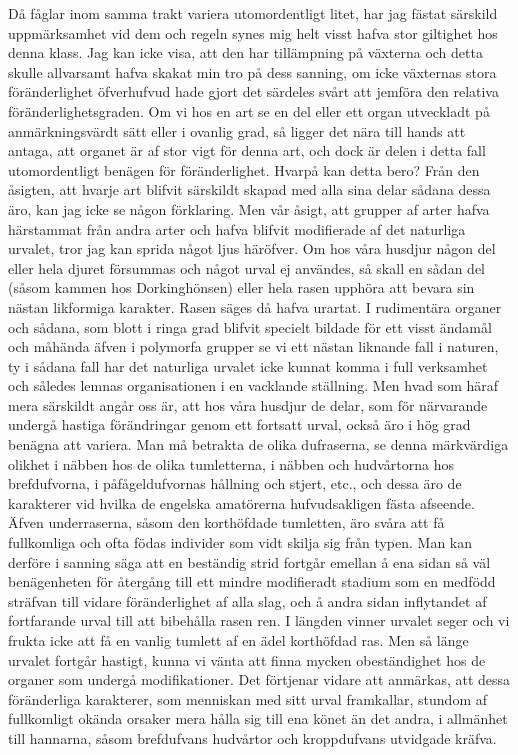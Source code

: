 Då fåglar inom samma trakt variera utomordentligt litet, har jag fästat särskild uppmärksamhet vid dem och regeln synes mig helt visst hafva stor giltighet hos denna klass. Jag kan icke visa, att den har tillämpning på växterna och detta skulle allvarsamt hafva skakat min tro på dess sanning, om icke växternas stora föränderlighet öfverhufvud hade gjort det särdeles svårt att jemföra den relativa föränderlighetsgraden.
Om vi hos en art se en del eller ett organ utveckladt på anmärkningsvärdt sätt eller i ovanlig grad, så ligger det nära till hands att antaga, att organet är af stor vigt för denna art, och dock är delen i detta fall utomordentligt benägen för föränderlighet. Hvarpå kan detta bero? Från den åsigten, att hvarje art blifvit särskildt skapad med alla sina delar sådana dessa äro, kan jag icke se någon förklaring. Men vår åsigt, att grupper af arter hafva härstammat från andra arter och hafva blifvit modifierade af det naturliga urvalet, tror jag kan sprida något ljus häröfver. Om hos våra husdjur någon del eller hela djuret försummas och något urval ej användes, så skall en sådan del (såsom kammen hos Dorkinghönsen) eller hela rasen upphöra att bevara sin nästan likformiga karakter. Rasen säges då hafva urartat. I rudimentära organer och sådana, som blott i ringa grad blifvit specielt bildade för ett visst ändamål och måhända äfven i polymorfa grupper se vi ett nästan liknande fall i naturen, ty i sådana fall har det naturliga urvalet icke kunnat komma i full verksamhet och således lemnas organisationen i en vacklande ställning. Men hvad som häraf mera särskildt angår oss är, att hos våra husdjur de delar, som för närvarande undergå hastiga förändringar genom ett fortsatt urval, också äro i hög grad benägna att variera. Man må betrakta de olika dufraserna, se denna märkvärdiga olikhet i näbben hos de olika tumletterna, i näbben och hudvårtorna hos brefdufvorna, i påfågeldufvornas hållning och stjert, etc., och dessa äro de karakterer vid hvilka de engelska amatörerna hufvudsakligen fästa afseende. Äfven underraserna, såsom den korthöfdade tumletten, äro svåra att få fullkomliga och ofta födas individer som vidt skilja sig från typen. Man kan derföre i sanning säga att en beständig strid fortgår emellan å ena sidan så väl benägenheten för återgång till ett mindre modifieradt stadium som en medfödd sträfvan till vidare föränderlighet af alla slag, och å andra sidan inflytandet af fortfarande urval till att bibehålla rasen ren. I längden vinner urvalet seger och vi frukta icke att få en vanlig tumlett af en ädel korthöfdad ras. Men så länge urvalet fortgår hastigt, kunna vi vänta att finna mycken obeständighet hos de organer som undergå modifikationer. Det förtjenar vidare att anmärkas, att dessa föränderliga karakterer, som menniskan med sitt urval framkallar, stundom af fullkomligt okända orsaker mera hålla sig till ena könet än det andra, i allmänhet till hannarna, såsom brefdufvans hudvårtor och kroppdufvans utvidgade kräfva.

